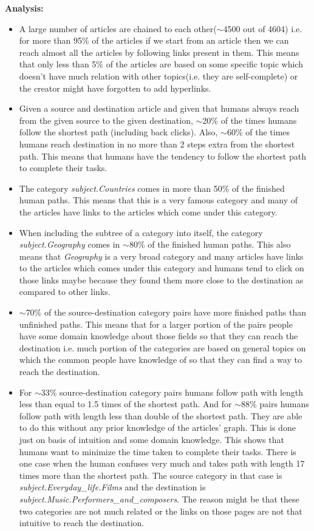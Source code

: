 \documentclass[20pt]{letter}
\begin{document}
\begin{enumerate}
{\textbf{Analysis:}
\begin{itemize}
    \item A large number of articles are chained to each other($\sim$4500 out of 4604) i.e. for more than 95\% of the articles if we start from an article then we can reach almost all the articles by following links present in them. This means that only less than 5\% of the articles are based on some specific topic which doesn't have much relation with other topics(i.e. they are self-complete) or the creator might have forgotten to add hyperlinks.
    \item Given a source and destination article and given that humans always reach from the given source to the given destination, $\sim$20\% of the times humans follow the shortest path (including back clicks). Also, $\sim$60\% of the times humans reach destination in no more than 2 steps extra from the shortest path. This means that humans have the tendency to follow the shortest path to complete their tasks.
    \item The category \textit{subject.Countries} comes in more than 50\% of the finished human paths. This means that this is a very famous category and many of the articles have links to the articles which come under this category.
    \item When including the subtree of a category into itself, the category \textit{subject.Geography} comes in $\sim$80\% of the finished human paths. This also means that \textit{Geography} is a very broad category and many articles have links to the articles which comes under this category and humans tend to click on those links maybe because they found them more close to the destination as compared to other links.
    \item $\sim$70\% of the source-destination category pairs have more finished paths than unfinished paths. This means that for a larger portion of the pairs people have some domain knowledge about those fields so that they can reach the destination i.e. much portion of the categories are based on general topics on which the common people have knowledge of so that they can find a way to reach the destination.
    \item For $\sim$33\% source-destination category pairs humans follow path with length less than equal to 1.5 times of the shortest path. And for $\sim$88\% pairs humans follow path with length less than double of the shortest path. They are able to do this without any prior knowledge of the articles' graph. This is done just on basis of intuition and some domain knowledge. This shows that humans want to minimize the time taken to complete their tasks. There is one case when the human confuses very much and takes path with length 17 times more than the shortest path. The source category in that case is \textit{subject.Everyday\_life.Films} and the destination is \textit{subject.Music.Performers\_and\_composers}. The reason might be that these two categories are not much related or the links on those pages are not that intuitive to reach the destination.
\end{itemize}


}

\end{enumerate}
\end{document}
